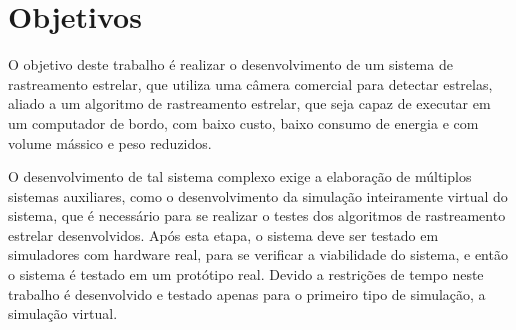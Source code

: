 \section{Objetivos}
\label{sec:Introducao_objectives}

O objetivo deste trabalho é realizar o desenvolvimento de um sistema de rastreamento estrelar, 
que utiliza uma câmera comercial para detectar estrelas, 
aliado a um algoritmo de rastreamento estrelar, 
que seja capaz de executar em um computador de bordo, com baixo custo, baixo consumo de energia e com volume mássico e peso reduzidos.

O desenvolvimento de tal sistema complexo exige a elaboração de múltiplos sistemas auxiliares, 
como o desenvolvimento da simulação inteiramente virtual do sistema, 
que é necessário para se realizar o testes dos algoritmos de rastreamento estrelar desenvolvidos. 
Após esta etapa, o sistema deve ser testado em simuladores com hardware real, para se verificar a viabilidade do sistema, e então o sistema é testado em um protótipo real.
Devido a restrições de tempo neste trabalho é desenvolvido e testado apenas para o primeiro tipo de simulação, a simulação virtual.
